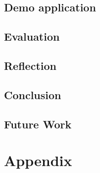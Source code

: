 \chapter{Demo application}


\chapter{Evaluation}




\chapter{Reflection}


\chapter{Conclusion}


\chapter{Future Work}


\printbibliography

\part{Appendix}
\appendix


